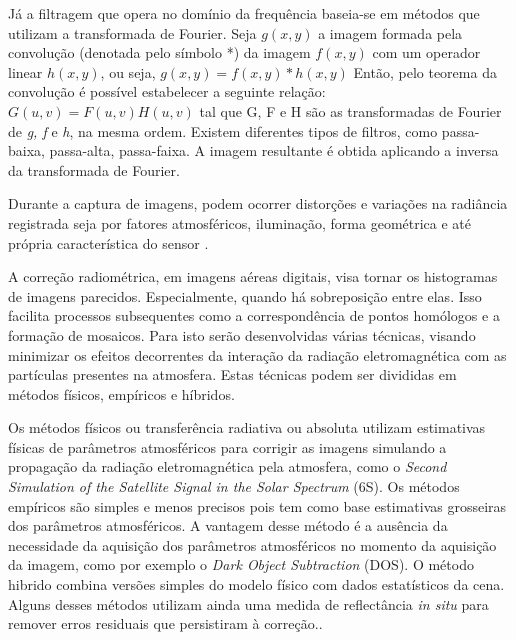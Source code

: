 \documentclass[
    12pt,                   %
    openright,              %
    oneside,                %
    a4paper,                %
    sumario=tradicional,    %
    english,                %
    brazil,                 %
    ]{abntex2}
\begin{document}
    Já a filtragem que opera no domínio da frequência baseia-se em métodos que utilizam a transformada de Fourier. Seja \begin{math}g(x,y)\end{math} a imagem formada pela convolução (denotada pelo símbolo *) da 
    imagem \begin{math}f(x,y)\end{math} com um operador linear \begin{math}h(x,y)\end{math}, ou seja, 
    \begin{math}g(x,y) = f(x,y)*h(x,y)\end{math}
    Então, pelo teorema da convolução é possível estabelecer a seguinte relação: 
    \begin{math}
        G(u,v) = F(u,v)H(u,v)
    \end{math}
    tal que G, F e H são as transformadas de Fourier de \textit{g, f} e \textit{h}, na mesma ordem. Existem diferentes tipos de filtros, como passa-baixa, passa-alta, passa-faixa. A imagem resultante é obtida aplicando a inversa da transformada de Fourier.

    Durante a captura de imagens, podem ocorrer distorções e variações na radiância registrada seja por fatores atmosféricos, iluminação, forma geométrica e até própria característica do sensor \cite{figueiredo2005conceitos}. 
    
    A correção radiométrica, em imagens aéreas digitais, visa tornar os histogramas de imagens parecidos. Especialmente, quando há sobreposição entre elas. Isso facilita processos subsequentes como a correspondência de pontos homólogos e a formação de mosaicos. Para isto serão desenvolvidas várias técnicas, visando minimizar os efeitos decorrentes da interação da radiação eletromagnética com as partículas presentes na atmosfera. Estas técnicas podem ser divididas em métodos físicos, empíricos e híbridos.
    
    Os métodos físicos ou transferência radiativa ou absoluta utilizam estimativas físicas de parâmetros atmosféricos para corrigir as imagens simulando a propagação da radiação eletromagnética pela atmosfera, como o \textit{Second Simulation of the Satellite Signal in the Solar Spectrum} (6S). Os métodos empíricos são simples e menos precisos pois tem como base estimativas grosseiras dos parâmetros atmosféricos. A vantagem desse método é a ausência da necessidade da aquisição dos parâmetros atmosféricos no momento da aquisição da imagem, como por exemplo o \textit{Dark Object Subtraction} (DOS). O método hibrido combina versões simples do modelo físico com dados estatísticos da cena. Alguns desses métodos utilizam ainda uma medida de reflectância \textit{in situ} para remover erros residuais que persistiram à correção.\cite{langhi2008correccao}.
\end{document}
